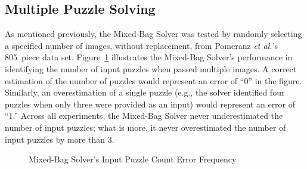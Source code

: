 \subsection{Multiple Puzzle Solving}

As mentioned previously, the Mixed-Bag Solver was tested by randomly selecting a specified number of images, without replacement, from Pomeranz \textit{et al.}'s  805~piece data set.  Figure~\ref{fig:inputPuzzleCountErrorFrequency} illustrates the Mixed-Bag Solver's  performance in identifying the number of input puzzles when passed multiple images.  A correct estimation of the number of puzzles would represent an error of ``0'' in the figure.  Similarly, an overestimation of a single puzzle (e.g., the solver identified four puzzles when only three were provided as an input) would represent an error of ``1.''  Across all experiments, the Mixed-Bag Solver never underestimated the number of input puzzles; what is more, it never overestimated the number of input puzzles by more than 3.  

\begin{figure}
\begin{center}
\end{center}
\caption{Mixed-Bag Solver's Input Puzzle Count Error Frequency}
\label{fig:inputPuzzleCountErrorFrequency}
\end{figure}

